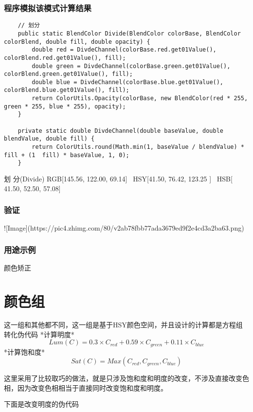 \subsubsection{ 程序模拟该模式计算结果}

\begin{lstlisting}
	// 划分
	public static BlendColor Divide(BlendColor colorBase, BlendColor colorBlend, double fill, double opacity) {
		double red = DivdeChannel(colorBase.red.get01Value(), colorBlend.red.get01Value(), fill);
		double green = DivdeChannel(colorBase.green.get01Value(), colorBlend.green.get01Value(), fill);
		double blue = DivdeChannel(colorBase.blue.get01Value(), colorBlend.blue.get01Value(), fill);
		return ColorUtils.Opacity(colorBase, new BlendColor(red * 255, green * 255, blue * 255), opacity);
	}
	
	private static double DivdeChannel(double baseValue, double blendValue, double fill) {
		return ColorUtils.round(Math.min(1, baseValue / blendValue) * fill + (1  fill) * baseValue, 1, 0);
	}
\end{lstlisting}



划    分(Divide)        RGB[145.56, 122.00,  69.14]~ HSY[41.50,  76.42, 123.25 ]~ HSB[ 41.50,  52.50,  57.08]


\subsubsection{ 验证}

![Image](https://pic4.zhimg.com/80/v2ab78fbb77ada3679ed9f2e4cd3a2ba63.png)

\subsubsection{ 用途示例}

颜色矫正

\section{颜色组}

这一组和其他都不同，这一组是基于HSY颜色空间，并且设计的计算都是方程组
转化伪代码
*计算明度*
$$Lum(C)=0.3\times C_{red}+0.59\times C_{green} + 0.11\times C_{blue}$$
*计算饱和度*
$$Sat(C)=Max(C_{red},C_{green},C_{blue})$$

这里采用了比较取巧的做法，就是只涉及饱和度和明度的改变，不涉及直接改变色相，因为改变色相相当于直接同时改变饱和度和明度。

下面是改变明度的伪代码


